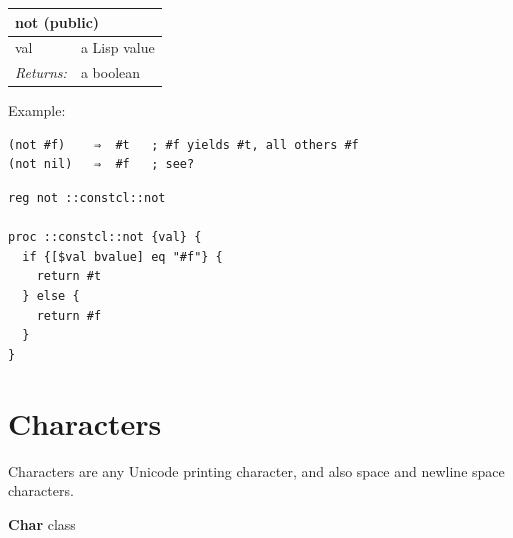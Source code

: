 \documentclass[twoside,9pt]{report}
\begin{document}
\begin{tabular}{ |l l| }
\hline
\multicolumn{2}{|l|}{not (public)} \\
\hline
val & a Lisp value \\
\textit{Returns:} & a boolean \\
\hline
\end{tabular}


Example:

\noindent\makebox[\linewidth]{\rule{\linewidth}{0.4pt}}
\begin{lstlisting}
(not #f)    ⇒  #t   ; #f yields #t, all others #f
(not nil)   ⇒  #f   ; see?
\end{lstlisting}
\noindent\makebox[\linewidth]{\rule{\linewidth}{0.4pt}}
\noindent\makebox[\linewidth]{\rule{\linewidth}{0.4pt}}
\begin{lstlisting}
reg not ::constcl::not
 
proc ::constcl::not {val} {
  if {[$val bvalue] eq "#f"} {
    return #t
  } else {
    return #f
  }
}
\end{lstlisting}
\noindent\makebox[\linewidth]{\rule{\linewidth}{0.4pt}}
\section{Characters}
\label{characters}

Characters are any Unicode printing character, and also space and newline space characters.


\textbf{Char} class
\end{document}
